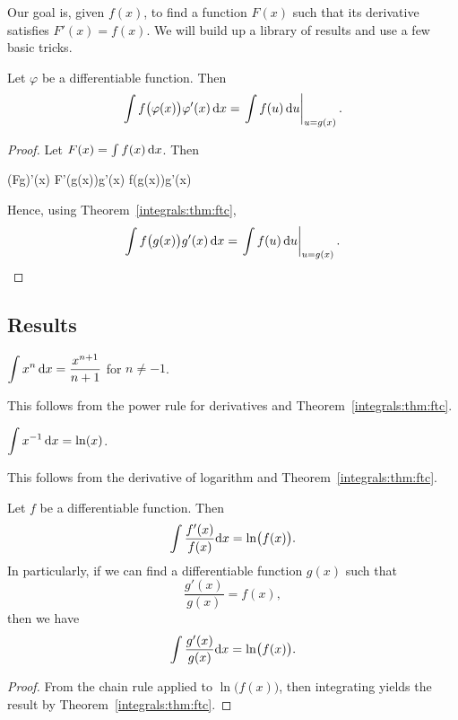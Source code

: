 \begin{remark}
Our goal is, given $f(x)$, to find a function $F(x)$ such that its
derivative satisfies $F'(x)=f(x)$. We will build up a library of results
and use a few basic tricks.
\end{remark}

\begin{corollary}\label{integrals:u-substitution}
Let $\varphi$ be a differentiable function. Then
\[ \int f\bigl(\varphi(x)\bigr)\varphi'(x)\,\mathrm{d} x = \left.\int f(u)\,\mathrm{d} u\right|_{u=g(x)}.\]
\end{corollary}

\begin{proof}
Let $F(x) = \int f(x)\,\mathrm{d} x$.
Then
\begin{calculation}
(F\circ g)'(x)
F'\bigl(g(x)\bigr)g'(x)
f\bigl(g(x)\bigr)g'(x)
\end{calculation}
Hence, using Theorem~\ref{integrals:thm:ftc},
\[ \int f\bigl(g(x)\bigr)g'(x)\,\mathrm{d} x = \left.\int f(u)\,\mathrm{d} u\right|_{u=g(x)}.\qedhere\]
\end{proof}

\subsection{Results}

\label{integrals:chunk:power-rule} $\displaystyle{\int x^{n}\,\mathrm{d}x = \frac{x^{n+1}}{n+1}}$
for $n\neq-1$.

This follows from the power rule for derivatives and
Theorem~\ref{integrals:thm:ftc}.

\label{prop:integral:logarithm} $\displaystyle{\int x^{-1}\,\mathrm{d}x = \ln(x)}$.

This follows from the derivative of logarithm and
Theorem~\ref{integrals:thm:ftc}.

\begin{corollary}\label{cor:integrals:log-trick}
Let $f$ be a differentiable function. Then
\[ \int\frac{f'(x)}{f(x)}\mathrm{d} x = \ln\bigl(f(x)\bigr).\]
In particularly, if we can find a differentiable function $g(x)$ such
that
\[ \frac{g'(x)}{g(x)} = f(x),\]
then we have
\begin{equation}
\int\frac{g'(x)}{g(x)}\mathrm{d} x = \ln\bigl(f(x)\bigr).
\end{equation}
\end{corollary}

\begin{proof}
From the chain rule applied to $\ln\bigl(f(x)\bigr)$, then integrating
yields the result by Theorem~\ref{integrals:thm:ftc}.
\end{proof}

